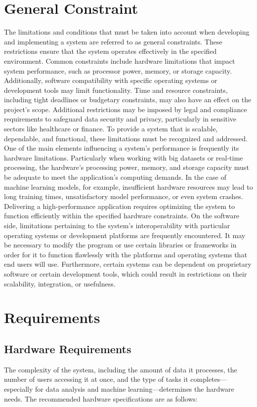 \section{General Constraint}
The limitations and conditions that must be taken into account when developing and implementing a system are referred to as general constraints. These restrictions ensure that the system operates effectively in the specified environment. Common constraints include hardware limitations that impact system performance, such as processor power, memory, or storage capacity. Additionally, software compatibility with specific operating systems or development tools may limit functionality. Time and resource constraints, including tight deadlines or budgetary constraints, may also have an effect on the project's scope. Additional restrictions may be imposed by legal and compliance requirements to safeguard data security and privacy, particularly in sensitive sectors like healthcare or finance. To provide a system that is scalable, dependable, and functional, these limitations must be recognized and addressed.
One of the main elements influencing a system's performance is frequently its hardware limitations. Particularly when working with big datasets or real-time processing, the hardware's processing power, memory, and storage capacity must be adequate to meet the application's computing demands. In the case of machine learning models, for example, insufficient hardware resources may lead to long training times, unsatisfactory model performance, or even system crashes. Delivering a high-performance application requires optimizing the system to function efficiently within the specified hardware constraints.
On the software side, limitations pertaining to the system's interoperability with particular operating systems or development platforms are frequently encountered. It may be necessary to modify the program or use certain libraries or frameworks in order for it to function flawlessly with the platforms and operating systems that end users will use. Furthermore, certain systems can be dependent on proprietary software or certain development tools, which could result in restrictions on their scalability, integration, or usefulness.

\section{Requirements}
\subsection{Hardware Requirements}The complexity of the system, including the amount of data it processes, the number of users accessing it at once, and the type of tasks it completes—especially for data analysis and machine learning—determines the hardware needs. The recommended hardware specifications are as follows:

